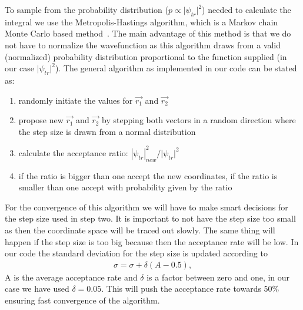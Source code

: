 To sample from the probability distribution (${p \propto |{\psi _{tr}}{|^2}}$) needed to calculate the integral we use the Metropolis-Hastings algorithm, which is a Markov chain Monte Carlo based method~\cite{robert2013monte}. The main advantage of this method is that we do not have to normalize the wavefunction as this algorithm draws from a valid (normalized) probability distribution proportional to the function supplied (in our case ${|{\psi _{tr}}{|^2}}$). The general algorithm as implemented in our code can be stated as:
\begin{enumerate}
\item randomly initiate the values for ${\overrightarrow {{r_1}} }$ and ${\overrightarrow {{r_2}} }$ 
\item  propose new ${\overrightarrow {{r_1}} }$ and ${\overrightarrow {{r_2}} }$ by stepping both vectors in a random direction where the step size is drawn from a normal distribution
\item calculate the acceptance ratio: $|{\psi _{tr}}|_{new}^2/|{\psi _{tr}}{|^2}$
\item if the ratio is bigger than one accept the new coordinates, if the ratio is smaller than one accept with probability given by the ratio
\end{enumerate}
For the convergence of this algorithm we will have to make smart decisions for the step size used in  step two. It is important to not have the step size too small as then the coordinate space will be traced out slowly. The same thing will happen if the step size is too big because then the acceptance rate will be low. In our code the standard deviation for the step size is updated according to
\begin{align}
\sigma  = \sigma  + \delta  (A - 0.5),
\end{align}
A is the average acceptance rate and $\delta$ is a factor between zero and one, in our case we have used $\delta=0.05$. This will push the acceptance rate towards 50\% ensuring fast convergence of the algorithm.


